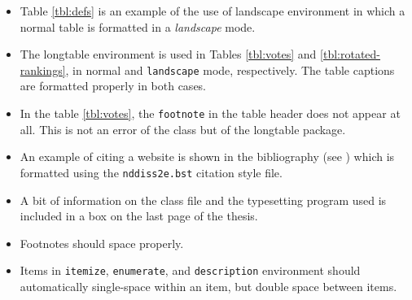 \documentclass[final,numrefs,sort&compress]{nddiss2e}
\begin{document}
\begin{itemize}
\item Table \ref{tbl:defs} is an example of the use of \textsf{landscape}
environment in which a normal table is formatted in a \emph{landscape} mode.
\item The \textsf{longtable} environment is used in Tables \ref{tbl:votes} and
\ref{tbl:rotated-rankings}, in normal and \verb+landscape+ mode, respectively. The
table captions are formatted properly in both cases.
\item In the table \ref{tbl:votes}, the \verb+footnote+ in the table header 
does not appear at all. This is not an error of the \nddiss\/ class but of the
\textsf{longtable} package.
\item An example of citing a website is shown in the bibliography (see
\citep{gairley2000}) which is formatted using the \verb+nddiss2e.bst+
citation style file.
\item A bit of information on the \nddiss\/ class file and the typesetting program
used is included in a box on the last page of the thesis.
\item Footnotes should space properly.
\item Items in \verb+itemize+, \verb+enumerate+, and \verb+description+ environment
should automatically single-space within an item, but double space between items.
\end{itemize}

%
%




%
%



%
%




%
%

\appendix




%
%

\end{document}
